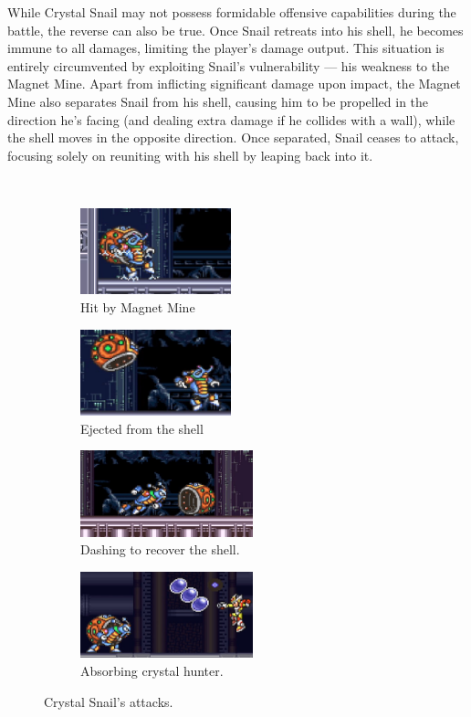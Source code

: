 While Crystal Snail may not possess formidable offensive capabilities during the battle, the reverse can also be true. Once Snail retreats into his shell, he becomes immune to all damages, limiting the player's damage output. This situation is entirely circumvented by exploiting Snail's vulnerability — his weakness to the Magnet Mine. Apart from inflicting significant damage upon impact, the Magnet Mine also separates Snail from his shell, causing him to be propelled in the direction he's facing (and dealing extra damage if he collides with a wall), while the shell moves in the opposite direction. Once separated, Snail ceases to attack, focusing solely on reuniting with his shell by leaping back into it.
\begin{figure}[htp]
	\centering
	\ContinuedFloat\
	\begin{subfigure}{0.45\linewidth}
		\centering
		\includegraphics[height=2.5cm]{figures/X2/Crystal_snail/Crystal_weakness.png}
		\caption{Hit by Magnet Mine}
	\end{subfigure}
	\begin{subfigure}{0.45\linewidth}
		\centering
		\includegraphics[height=2.5cm]{figures/X2/Crystal_snail/Crystal_weakness_2.png}
		\caption{Ejected from the shell}
	\end{subfigure}
	\begin{subfigure}{0.49\linewidth}
		\centering
		\includegraphics[height=2.5cm]{figures/X2/Crystal_snail/Crystal_no_shell.png}
		\caption{Dashing to recover the shell.}
	\end{subfigure}
	\begin{subfigure}{0.49\linewidth}
		\centering
		\includegraphics[height=2.5cm]{figures/X2/Crystal_snail/Crystal_hunter_absorb.png}
		\caption{Absorbing crystal hunter.}
	\end{subfigure}
	\caption{Crystal Snail's attacks.}	
\end{figure}

